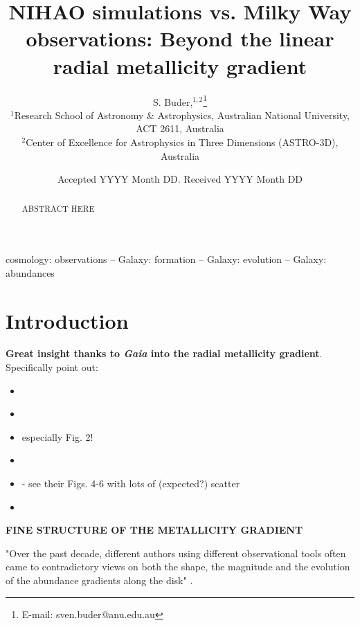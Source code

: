 \documentclass[fleqn,usenatbib]{mnras}
\title[NIHAO vs. Milky Way: Beyond linear radial metallicity gradients]{NIHAO simulations vs. Milky Way observations: Beyond the linear radial metallicity gradient}
\author[S. Buder]{
S. Buder,$^{1,2}$\thanks{E-mail: sven.buder@anu.edu.au}
\\
$^{1}$Research School of Astronomy \& Astrophysics, Australian National University, ACT 2611, Australia\\
$^{2}$Center of Excellence for Astrophysics in Three Dimensions (ASTRO-3D), Australia\\
}
\date{Accepted YYYY Month DD. Received YYYY Month DD}
\begin{document}
\label{firstpage}
\pagerange{\pageref{firstpage}--\pageref{lastpage}}
\maketitle

\begin{abstract} %
ABSTRACT HERE
\end{abstract}
\begin{keywords}
cosmology: observations -- Galaxy: formation -- Galaxy: evolution -- Galaxy: abundances
\end{keywords}



\section{Introduction}
\label{sec:intro}

\textbf{Great insight thanks to \textit{Gaia} into the radial metallicity gradient}. Specifically point out:
\begin{itemize}
    \item \citet{Eilers2019}
    \item \citet{Poggio2021}
    \item \citet{Poggio2022} especially Fig. 2!
    \item \citet{Imig2023}
    \item \citet{Chen2023} - see their Figs. 4-6 with lots of (expected?) scatter
    \item \citet{Hackshaw2024}
\end{itemize}

\textbf{FINE STRUCTURE OF THE METALLICITY GRADIENT} \citep{Genovali2014}

"Over the past decade, different authors using different observational tools often came to contradictory views on both the shape, the magnitude and the evolution of the abundance gradients along the disk" \citep{Chiappini2002}.
\end{document}
